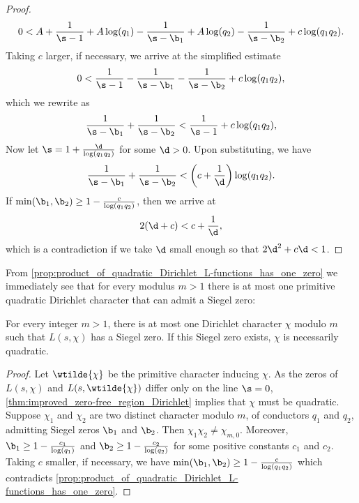 \begin{proof}
        \[
         0 < A+\frac{1}{\s-1}+A\log(q_{1})-\frac{1}{\s-\b_{1}}+A\log(q_{2})-\frac{1}{\s-\b_{2}}+c\log(q_{1}q_{2}).
        \]
        Taking $c$ larger, if necessary, we arrive at the simplified estimate
        \[
          0 < \frac{1}{\s-1}-\frac{1}{\s-\b_{1}}-\frac{1}{\s-\b_{2}}+c\log(q_{1}q_{2}),
        \]
        which we rewrite as
        \[
          \frac{1}{\s-\b_{1}}+\frac{1}{\s-\b_{2}} < \frac{1}{\s-1}+c\log(q_{1}q_{2}),
        \]
        Now let $\s = 1+\frac{\d}{\log(q_{1}q_{2})}$ for some $\d > 0$. Upon substituting, we have
        \[
          \frac{1}{\s-\b_{1}}+\frac{1}{\s-\b_{2}} < \left(c+\frac{1}{\d}\right)\log(q_{1}q_{2}).
        \]
        If $\min(\b_{1},\b_{2}) \ge 1-\frac{c}{\log(q_{1}q_{2})}$, then we arrive at
        \[
          2(\d+c) < c+\frac{1}{\d},
        \]
        which is a contradiction if we take $\d$ small enough so that $2\d^{2}+c\d < 1$.
      \end{proof}
    
      From \cref{prop:product_of_quadratic_Dirichlet_L-functions_has_one_zero} we immediately see that for every modulus $m > 1$ there is at most one primitive quadratic Dirichlet character that can admit a Siegel zero:

    \begin{proposition}\label{prop:at_most_one_Siegel_zero_per_modulus}
      For every integer $m > 1$, there is at most one Dirichlet character $\chi$ modulo $m$ such that $L(s,\chi)$ has a Siegel zero. If this Siegel zero exists, $\chi$ is necessarily quadratic.
    \end{proposition}
    \begin{proof}
      Let $\wtilde{\chi}$ be the primitive character inducing $\chi$. As the zeros of $L(s,\chi)$ and $L(s,\wtilde{\chi})$ differ only on the line $\s = 0$, \cref{thm:improved_zero-free_region_Dirichlet} implies that $\chi$ must be quadratic. Suppose $\chi_{1}$ and $\chi_{2}$ are two distinct character modulo $m$, of conductors $q_{1}$ and $q_{2}$, admitting Siegel zeros $\b_{1}$ and $\b_{2}$. Then $\chi_{1}\chi_{2} \neq \chi_{m,0}$. Moreover, $\b_{1} \ge 1-\frac{c_{1}}{\log(q_{1})}$ and $\b_{2} \ge 1-\frac{c_{2}}{\log(q_{2})}$ for some positive constants $c_{1}$ and $c_{2}$. Taking $c$ smaller, if necessary, we have $\min(\b_{1},\b_{2}) \ge 1-\frac{c}{\log(q_{1}q_{2})}$ which contradicts \cref{prop:product_of_quadratic_Dirichlet_L-functions_has_one_zero}.
    \end{proof}
